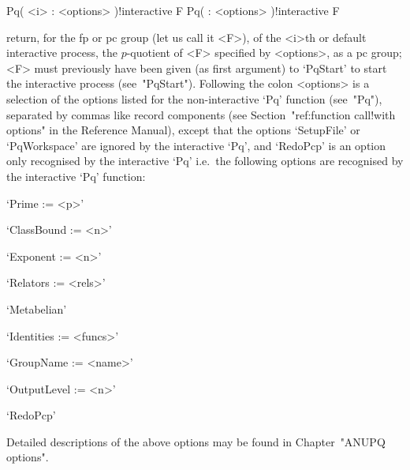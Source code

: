 \>Pq( <i> : <options> )!{interactive} F
\>Pq( : <options> )!{interactive} F

return, for  the fp  or pc group (let us  call it <F>),  of the  <i>th or
default interactive  {\ANUPQ} process, the $p$-quotient  of <F> specified
by <options>,  as a  pc group;  <F> must previously  have been  given (as
first argument)  to `PqStart' to  start the interactive  {\ANUPQ} process
(see~"PqStart").   Following the colon  <options> is  a selection  of the
options  listed   for  the  non-interactive   `Pq'  function  (see~"Pq"),
separated  by commas  like record  components  (see Section~"ref:function
call!with  options" in  the  {\GAP} Reference  Manual),  except that  the
options `SetupFile' or `PqWorkspace' are ignored by the interactive `Pq',
and  `RedoPcp' is  an  option  only recognised  by  the interactive  `Pq'
i.e.~the  following  options  are  recognised  by  the  interactive  `Pq'
function:

\beginlist%

\item{}`Prime := <p>'

\item{}`ClassBound := <n>'

\item{}`Exponent := <n>'

\item{}`Relators := <rels>'

\item{}`Metabelian'

\item{}`Identities := <funcs>'

\item{}`GroupName := <name>'

\item{}`OutputLevel := <n>'

\item{}`RedoPcp'

\endlist

Detailed descriptions of the above options may be found in Chapter~"ANUPQ
options".

